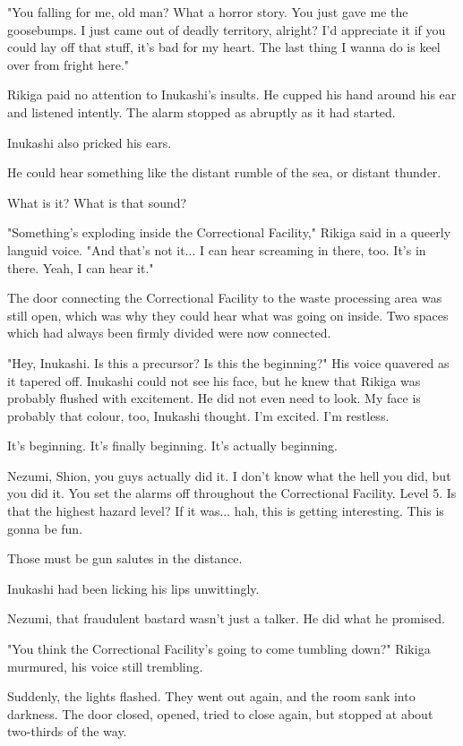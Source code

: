 "You falling for me, old man? What a horror story. You just gave me the
goosebumps. I just came out of deadly territory, alright? I'd appreciate
it if you could lay off that stuff, it's bad for my heart. The last
thing I wanna do is keel over from fright here."

Rikiga paid no attention to Inukashi's insults. He cupped his hand
around his ear and listened intently. The alarm stopped as abruptly as
it had started.

Inukashi also pricked his ears.

He could hear something like the distant rumble of the sea, or distant
thunder.

What is it? What is that sound?

"Something's exploding inside the Correctional Facility," Rikiga said in
a queerly languid voice. "And that's not it... I can hear screaming in
there, too. It's in there. Yeah, I can hear it."

The door connecting the Correctional Facility to the waste processing
area was still open, which was why they could hear what was going on
inside. Two spaces which had always been firmly divided were now
connected.

"Hey, Inukashi. Is this a precursor? Is this the beginning?" His voice
quavered as it tapered off. Inukashi could not see his face, but he knew
that Rikiga was probably flushed with excitement. He did not even need
to look. My face is probably that colour, too, Inukashi thought. I'm
excited. I'm restless.

It's beginning. It's finally beginning. It's actually beginning.

Nezumi, Shion, you guys actually did it. I don't know what the hell you
did, but you did it. You set the alarms off throughout the Correctional
Facility. Level 5. Is that the highest hazard level? If it was... hah,
this is getting interesting. This is gonna be fun.

Those must be gun salutes in the distance.

Inukashi had been licking his lips unwittingly.

Nezumi, that fraudulent bastard wasn't just a talker. He did what he
promised.

"You think the Correctional Facility's going to come tumbling down?"
Rikiga murmured, his voice still trembling.

Suddenly, the lights flashed. They went out again, and the room sank
into darkness. The door closed, opened, tried to close again, but
stopped at about two-thirds of the way.

